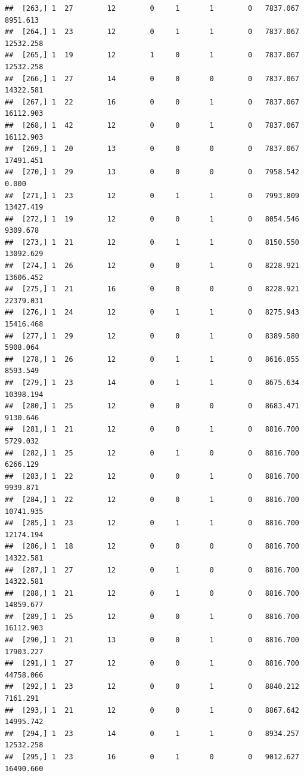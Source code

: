 \documentclass[
]{article}
\begin{document}
\begin{verbatim}
##  [263,] 1  27        12        0     1       1        0   7837.067   8951.613
##  [264,] 1  23        12        0     1       1        0   7837.067  12532.258
##  [265,] 1  19        12        1     0       1        0   7837.067  12532.258
##  [266,] 1  27        14        0     0       0        0   7837.067  14322.581
##  [267,] 1  22        16        0     0       1        0   7837.067  16112.903
##  [268,] 1  42        12        0     0       1        0   7837.067  16112.903
##  [269,] 1  20        13        0     0       0        0   7837.067  17491.451
##  [270,] 1  29        13        0     0       0        0   7958.542      0.000
##  [271,] 1  23        12        0     1       1        0   7993.809  13427.419
##  [272,] 1  19        12        0     0       1        0   8054.546   9309.678
##  [273,] 1  21        12        0     1       1        0   8150.550  13092.629
##  [274,] 1  26        12        0     0       1        0   8228.921  13606.452
##  [275,] 1  21        16        0     0       0        0   8228.921  22379.031
##  [276,] 1  24        12        0     1       1        0   8275.943  15416.468
##  [277,] 1  29        12        0     0       1        0   8389.580   5908.064
##  [278,] 1  26        12        0     1       1        0   8616.855   8593.549
##  [279,] 1  23        14        0     1       1        0   8675.634  10398.194
##  [280,] 1  25        12        0     0       0        0   8683.471   9130.646
##  [281,] 1  21        12        0     0       1        0   8816.700   5729.032
##  [282,] 1  25        12        0     1       0        0   8816.700   6266.129
##  [283,] 1  22        12        0     0       1        0   8816.700   9939.871
##  [284,] 1  22        12        0     0       1        0   8816.700  10741.935
##  [285,] 1  23        12        0     1       1        0   8816.700  12174.194
##  [286,] 1  18        12        0     0       0        0   8816.700  14322.581
##  [287,] 1  27        12        0     1       0        0   8816.700  14322.581
##  [288,] 1  21        12        0     1       0        0   8816.700  14859.677
##  [289,] 1  25        12        0     0       1        0   8816.700  16112.903
##  [290,] 1  21        13        0     0       1        0   8816.700  17903.227
##  [291,] 1  27        12        0     0       1        0   8816.700  44758.066
##  [292,] 1  23        12        0     0       1        0   8840.212   7161.291
##  [293,] 1  21        12        0     0       1        0   8867.642  14995.742
##  [294,] 1  23        14        0     1       1        0   8934.257  12532.258
##  [295,] 1  23        16        0     1       0        0   9012.627  16490.660

\end{verbatim}
\end{document}
